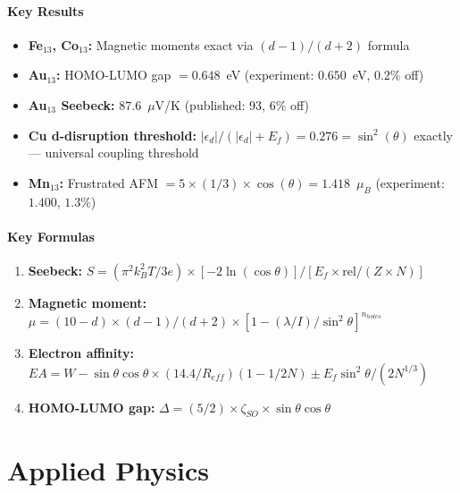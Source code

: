 \documentclass[11pt, a4paper]{article}
\begin{document}
\subsection{Key Results}

\begin{itemize}[nosep]
  \item \textbf{Fe$_{13}$, Co$_{13}$:} Magnetic moments exact via
        $(d-1)/(d+2)$ formula
  \item \textbf{Au$_{13}$:} HOMO-LUMO gap $= 0.648$~eV
        (experiment: $0.650$~eV, $0.2\%$ off)
  \item \textbf{Au$_{13}$ Seebeck:} $87.6$~$\mu$V/K
        (published: 93, $6\%$ off)
  \item \textbf{Cu d-disruption threshold:}
        $|{\epsilon_d}|/(|{\epsilon_d}|+E_f) = 0.276 = \sin^2(\theta)$
        exactly --- universal coupling threshold
  \item \textbf{Mn$_{13}$:} Frustrated AFM $= 5 \times (1/3)
        \times \cos(\theta) = 1.418$~$\mu_B$
        (experiment: $1.400$, $1.3\%$)
\end{itemize}

\subsection{Key Formulas}

\begin{enumerate}[nosep]
  \item \textbf{Seebeck:}
    $S = (\pi^2 k_B^2 T / 3e) \times [-2\ln(\cos\theta)]
    / [E_f \times \text{rel} / (Z \times N)]$
  \item \textbf{Magnetic moment:}
    $\mu = (10-d) \times (d-1)/(d+2)
    \times [1 - (\lambda/I)/\sin^2\theta]^{n_{holes}}$
  \item \textbf{Electron affinity:}
    $EA = W - \sin\theta\cos\theta \times (14.4/R_{eff})(1-1/2N)
    \pm E_f \sin^2\theta / (2N^{1/3})$
  \item \textbf{HOMO-LUMO gap:}
    $\Delta = (5/2) \times \zeta_{SO} \times \sin\theta\cos\theta$
\end{enumerate}

\newpage

\part{Applied Physics}
\end{document}
